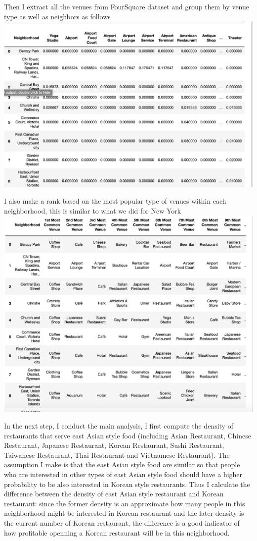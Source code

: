 \documentclass[12pt]{article}
\begin{document}
Then I extract all the venues from FourSquare dataset and group them by venue type as well as neighbors as follows\\
\includegraphics[scale=0.55]{image/2.png}

I also make a rank based on the most popular type of venues within each neighborhood, this is similar to what we did for New York\\
\includegraphics[scale=0.55]{image/3.png}

In the next step, I conduct the main analysis, I first compute the density of restaurants that serve east Asian style food (including Asian Restaurant, Chinese Restaurant, Japanese Restaurant, Korean Restaurant, Sushi Restaurant, Taiwanese Restaurant, Thai Restaurant and Vietnamese Restaurant). The assumption I make is that the east Asian style food are similar so that people who are interested in other types of east Asian style food should have a higher probability to be also interested in Korean style restaurants. Thus I calculate the difference between the density of east Asian style restaurant and Korean restaurant: since the former density is an approximate how many people in this neighborhood might be interested in Korean restaurant and the later density is the current number of Korean restaurant, the difference is a good indicator of how profitable openning a Korean restaurant will be in this neighborhood.
\end{document}
